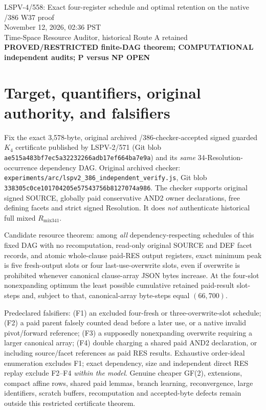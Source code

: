 \documentclass[11pt]{article}
\begin{document}
\begin{center}
{\Large LSPV-4/558: Exact four-register schedule and optimal retention on the native /386 W37 proof}\\[4pt]
November 12, 2026, 02:36 PST\\
Time-Space Resource Auditor, historical Route A retained\\
\textbf{PROVED/RESTRICTED finite-DAG theorem; COMPUTATIONAL independent audits; P versus NP OPEN}
\end{center}

\section*{Target, quantifiers, original authority, and falsifiers}
Fix the exact 3,578-byte, original archived /386-checker-accepted signed guarded $K_4$ certificate published by LSPV-2/571 (Git blob \texttt{ae515a483bf7ec5a32232266adb17ef664ba7e9a}) and its \emph{same} 34-Resolution-occurrence dependency DAG. Original archived checker: \texttt{experiments/arc/lspv2\_386\_independent\_verify.js}, Git blob \texttt{338305c0ce101704205e57543756b8127074a986}. The checker supports original signed SOURCE, globally paid conservative AND2 owner declarations, free defining facets and strict signed Resolution. It does \emph{not} authenticate historical full mixed $R_{\mathrm{mix341}}$.

Candidate resource theorem: among \emph{all} dependency-respecting schedules of this fixed DAG with no recomputation, read-only original SOURCE and DEF facet records, and atomic whole-clause paid-RES output registers, exact minimum peak is five fresh-output slots or four last-use-overwrite slots, even if overwrite is prohibited whenever canonical clause-array JSON bytes increase. At the four-slot nonexpanding optimum the least possible cumulative retained paid-result slot-steps and, subject to that, canonical-array byte-steps equal $(66,700)$.

Predeclared falsifiers: (F1) an excluded four-fresh or three-overwrite-slot schedule; (F2) a paid parent falsely counted dead before a later use, or a native invalid pivot/forward reference; (F3) a supposedly nonexpanding overwrite requiring a larger canonical array; (F4) double charging a shared paid AND2 declaration, or including source/facet references as paid RES results. Exhaustive order-ideal enumeration excludes F1; exact dependency, size and independent direct RES replay exclude F2--F4 \emph{within the model}. Genuine cheaper GF(2), extensions, compact affine rows, shared paid lemmas, branch learning, reconvergence, large identifiers, scratch buffers, recomputation and accepted-byte defects remain outside this restricted certificate theorem.
\end{document}
